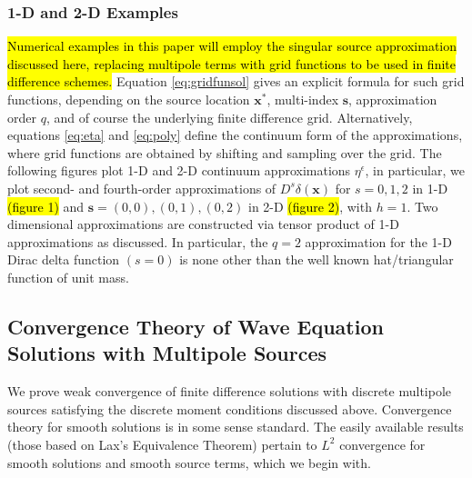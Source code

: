 \subsubsection{1-D and 2-D Examples}

\hl{Numerical examples in this paper will employ the singular source approximation discussed here, replacing multipole terms with grid functions to be used in finite difference schemes.}
Equation \ref{eq:gridfunsol} gives an explicit formula for such grid functions, depending on the source location $\mathbf x^*$, multi-index $\mathbf s$, approximation order $q$, and of course the underlying finite difference grid.
Alternatively, equations \ref{eq:eta} and \ref{eq:poly} define the continuum form of the approximations, where grid functions are obtained by shifting and sampling over the grid.
The following figures plot 1-D and 2-D continuum approximations $\eta^\epsilon$,
in particular, we plot second- and fourth-order approximations of 
$D^s\delta(\mathbf x)$ for $s=0,1,2$ in 1-D \hl{(figure 1)} and $\mathbf s=(0,0),(0,1),(0,2)$ in 2-D \hl{(figure 2)}, with $h=1$.
Two dimensional approximations are constructed via tensor product of 1-D approximations as discussed.
In particular, the $q=2$ approximation for the 1-D Dirac delta function $(s=0)$ is none other than the well known hat/triangular function of unit mass.


\subsection{Convergence Theory of Wave Equation Solutions with
  Multipole Sources}

We prove weak convergence of finite difference solutions with discrete multipole
sources satisfying the discrete moment conditions discussed above. 
Convergence theory for smooth solutions is in some sense standard. 
The easily available results (those based on Lax's Equivalence Theorem) 
pertain to $L^2$ convergence for smooth solutions and smooth source terms,
which we begin with.

